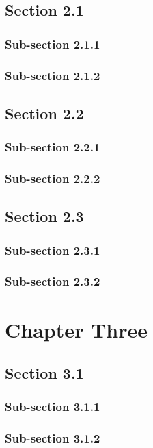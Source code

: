 \documentclass[a4paper,12pt]{book}
\begin{document}
\section{Section 2.1}
\subsection{Sub-section 2.1.1}
\lipsum[13-14]
\subsection{Sub-section 2.1.2}
\lipsum[15-16]

\section{Section 2.2}
\subsection{Sub-section 2.2.1}
\lipsum[17-18]
\subsection{Sub-section 2.2.2}
\lipsum[19-20]

\section{Section 2.3}
\subsection{Sub-section 2.3.1}
\lipsum[21-22]
\subsection{Sub-section 2.3.2}
\lipsum[23-24]

\chapter{Chapter Three}
\section{Section 3.1}
\subsection{Sub-section 3.1.1}
\lipsum[25-26]
\subsection{Sub-section 3.1.2}
\lipsum[27-28]
\end{document}
